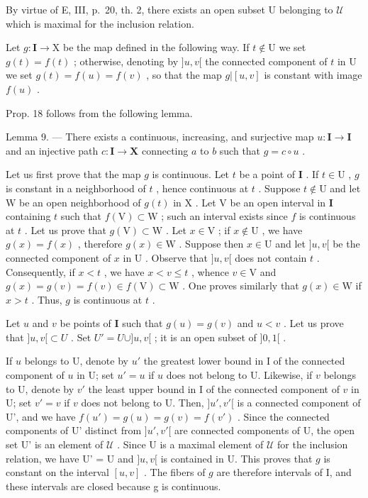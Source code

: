 By virtue of E, III, p.~20, th. 2, there exists an open subset U belonging to \(\mathcal{U}\) which is maximal for the inclusion relation.

Let \(g \colon \mathbf{I} \to \mathrm{X}\) be the map defined in the following way. If \(t \notin \mathrm{U}\) we set \(g(t) = f(t)\) ; otherwise, denoting by \(]u, v[\) the connected component of \(t\) in \(\mathrm{U}\) we set \(g(t) = f(u) = f(v)\) , so that the map \(g|[u, v]\) is constant with image \(f(u)\) .

Prop. 18 follows from the following lemma.

Lemma 9. --- There exists a continuous, increasing, and surjective map \(u\colon\mathbf{I}\to\mathbf{I}\) and an injective path \(c\colon\mathbf{I}\to\mathbf{X}\) connecting \(a\) to \(b\) such that \(g=c\circ u\) .

Let us first prove that the map \(g\) is continuous. Let \(t\) be a point of \(\mathbf{I}\) . If \(t \in \mathrm{U}\) , \(g\) is constant in a neighborhood of \(t\) , hence continuous at \(t\) . Suppose \(t \notin \mathrm{U}\) and let \(\mathrm{W}\) be an open neighborhood of \(g(t)\) in \(\mathrm{X}\) . Let \(\mathrm{V}\) be an open interval in \(\mathbf{I}\) containing \(t\) such that \(f(\mathrm{V}) \subset \mathrm{W}\) ; such an interval exists since \(f\) is continuous at \(t\) . Let us prove that \(g(\mathrm{V}) \subset \mathrm{W}\) . Let \(x \in \mathrm{V}\) ; if \(x \notin \mathrm{U}\) , we have \(g(x) = f(x)\) , therefore \(g(x) \in \mathrm{W}\) . Suppose then \(x \in \mathrm{U}\) and let \(]u, v[\) be the connected component of \(x\) in \(\mathrm{U}\) . Observe that \(]u, v[\) does not contain \(t\) . Consequently, if \(x < t\) , we have \(x < v \leqslant t\) , whence \(v \in \mathrm{V}\) and \(g(x) = g(v) = f(v) \in f(\mathrm{V}) \subset \mathrm{W}\) . One proves similarly that \(g(x) \in \mathrm{W}\) if \(x > t\) . Thus, \(g\) is continuous at \(t\) .

Let \(u\) and \(v\) be points of \(\mathbf{I}\) such that \(g(u) = g(v)\) and \(u < v\) . Let us prove that \(]u, v[ \subset U\) . Set \(U' = U \cup ]u, v[\) ; it is an open subset of \(]0, 1[\) .

If \(u\) belongs to U, denote by \(u'\) the greatest lower bound in I of the connected component of \(u\) in U; set \(u' = u\) if \(u\) does not belong to U. Likewise, if \(v\) belongs to U, denote by \(v'\) the least upper bound in I of the connected component of \(v\) in U; set \(v' = v\) if \(v\) does not belong to U. Then, \(]u', v'[\) is a connected component of U', and we have \(f(u') = g(u) = g(v) = f(v')\) . Since the connected components of U' distinct from \(]u', v'[\) are connected components of U, the open set U' is an element of \(\mathcal{U}\) . Since U is a maximal element of \(\mathcal{U}\) for the inclusion relation, we have U' = U and \(]u, v[\) is contained in U. This proves that \(g\) is constant on the interval \([u, v]\) . The fibers of \(g\) are therefore intervals of I, and these intervals are closed because g is continuous.

